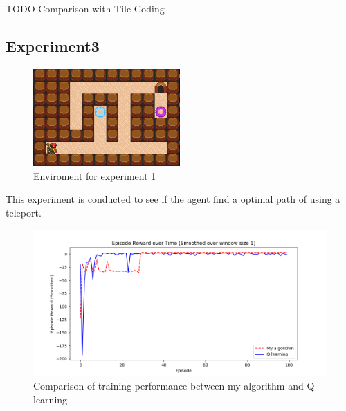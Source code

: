 TODO Comparison with Tile Coding
\newpage
\subsection{Experiment3}

\begin{figure}[!htb]
\centering
\includegraphics[width=0.5\textwidth]{./figures/experiment3_v2}
\caption{Enviroment for experiment 1}
\label{experiment1}
\end{figure}

This experiment is conducted to see if the agent find a optimal path of using a teleport. 

\begin{figure}[!htb]
\centering
\includegraphics[width=1.0\textwidth]{./figures/experiment3_training}
\caption{Comparison of training performance between my algorithm and Q-learning}
\label{experiment1_training}
\end{figure}

